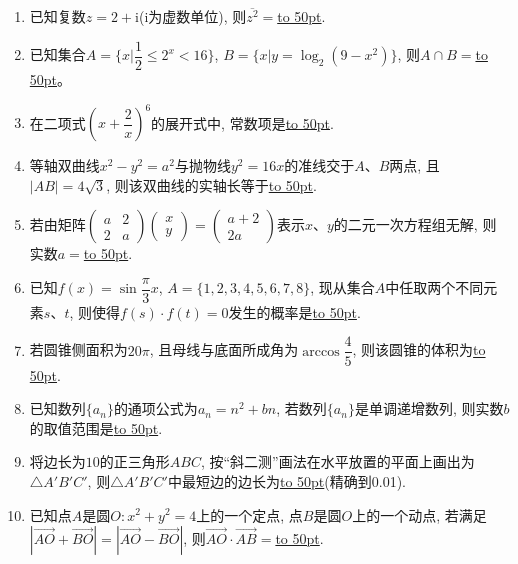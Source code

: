 \documentclass[10pt,a4paper]{article}
\newcommand{\blank}[1]{\underline{\hbox to #1pt{}}}
\begin{document}
\begin{enumerate}[1.]
\item 已知复数$z=2+\mathrm{i}$($\mathrm{i}$为虚数单位), 则$\overline{{z^2}}=$\blank{50}.
\item 已知集合$A=\{x|\dfrac12\le {2^x}<16\}$, $B=\{x|y=\log _2(9-x^2)\}$, 则$A\cap B=$\blank{50}。
\item 在二项式$(x+\dfrac2x)^6$的展开式中, 常数项是\blank{50}.
\item 等轴双曲线$x^2-y^2=a^2$与抛物线$y^2=16x$的准线交于$A$、$B$两点, 且$|AB|=4\sqrt3$, 则该双曲线的实轴长等于\blank{50}.
\item 若由矩阵$\begin{pmatrix}a & 2 \\ 2 & a\end{pmatrix}\begin{pmatrix}x \\ y\end{pmatrix}=\begin{pmatrix}a+2 \\ 2a\end{pmatrix}$表示$x$、$y$的二元一次方程组无解, 则实数$a=$\blank{50}.
\item 已知$f(x)=\sin\dfrac\pi 3x$, $A=\{1,2,3,4,5,6,7,8\}$, 现从集合$A$中任取两个不同元素$s$、$t$, 则使得$f(s)\cdot f(t)=0$发生的概率是\blank{50}.
\item 若圆锥侧面积为$20\pi$, 且母线与底面所成角为$\arccos \dfrac45$, 则该圆锥的体积为\blank{50}.
\item 已知数列$\{a_n\}$的通项公式为$a_n=n^2+bn$, 若数列$\{a_n\}$是单调递增数列, 则实数$b$的取值范围是\blank{50}.
\item 将边长为$10$的正三角形$ABC$, 按``斜二测''画法在水平放置的平面上画出为$\triangle A'B'C'$, 则$\triangle A'B'C'$中最短边的边长为\blank{50}(精确到0.01).
\item 已知点$A$是圆$O: x^2+y^2=4$上的一个定点, 点$B$是圆$O$上的一个动点, 若满足$|\overrightarrow{AO}+\overrightarrow{BO}|=|\overrightarrow{AO}-\overrightarrow{BO}|$, 则$\overrightarrow{AO}\cdot \overrightarrow{AB}=$\blank{50}.



\end{enumerate}
\end{document}
